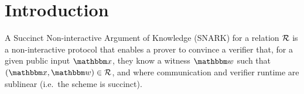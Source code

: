 \begin{abstract}
 We implement \ftwoz-SNARK and use it to prove, among others, SHA-256 hashing followed by ECDSA signature verification; RSA modular exponentiation and Poseidon hashing;  integer multiplication; and SHA-256 hashing followed by multiplication modulo $2^{32}$, consistently obtaining better performance than prior approaches on most tasks. As an example, we achieve a throughput of $9$ million proved 32-bit integer multiplications per second on a  MacBook Air M5 24\,GB (10 threads, CPU-only) with proof sizes under $200$\,kB. We prove a SHA-256 hash of a $2$\,kB ($2^5$ compressions) message followed by a P-256 ECDSA signature verification with $32$\,ms and $3.1$\,ms prover and verifier time, respectively, and with a proof of $65$\,kB, single-threaded. With $10$ threads the times are $17$\,ms and $3.7$\,ms. 
 

\end{abstract}

\setcounter{tocdepth}{2}

\iflncs\else\tableofcontents\fi


\section{Introduction}\label{s:intro}



A Succinct Non-interactive Argument of Knowledge (SNARK) for a relation $\mathcal{R}$ is a non-interactive protocol that enables a prover to convince a verifier that, for a given public input $\inp$, they know a witness $\wit$ such that $(\inp,\wit)\in \Relation$, and where communication and verifier runtime are sublinear (i.e.\ the scheme is succinct).

